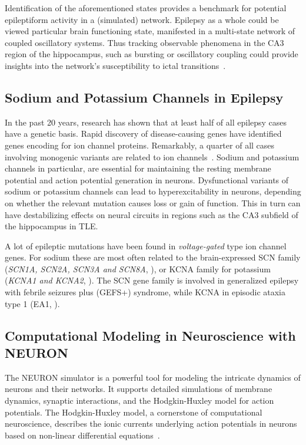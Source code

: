 \noindent
Identification of the aforementioned states provides a benchmark for potential epileptiform activity in a (simulated) network.
Epilepsy as a whole could be viewed particular brain functioning state, manifested in a multi-state network of coupled oscillatory systems.
Thus tracking observable phenomena in the CA3 region of the hippocampus, such as bursting or oscillatory coupling could provide insights 
into the network's susceptibility to ictal transitions~\parencite{kalitzinEpilepsyManifestationMultistate2019a}.

\subsection{Sodium and Potassium Channels in Epilepsy}
In the past 20 years, research has shown that at least half of all epilepsy cases have a genetic basis.
Rapid discovery of disease-causing genes have identified genes encoding for ion channel proteins.
Remarkably, a quarter of all cases involving monogenic variants are related to ion channels~\parencite{strianoGeneticTestingPrecision2020,oyrerIonChannelsGenetic2018}.
Sodium and potassium channels in particular, are essential for maintaining the resting
membrane potential and action potential generation in neurons.
Dysfunctional variants of sodium or potassium channels can lead to hyperexcitability in neurons, depending on whether the relevant mutation causes loss or gain of function.
This in turn can have destabilizing effects on neural circuits in regions such as the CA3 subfield of the hippocampus in TLE\@.

A lot of epileptic mutations have been found in \textit{voltage-gated} type ion channel genes.
For sodium these are most often related to the brain-expressed SCN family (\textit{SCN1A, SCN2A, SCN3A and SCN8A}, \textcite{brunklausSodiumChannelEpilepsies2020}), 
or KCNA family for potassium  (\textit{KCNA1 and KCNA2}, \textcite{gaoPotassiumChannelsEpilepsy2022}).
The SCN gene family is involved in  generalized epilepsy with febrile seizures plus (GEFS+) syndrome, while KCNA in episodic ataxia type 1 (EA1, \textcite{gravesIonChannelsEpilepsy2006}).

\subsection{Computational Modeling in Neuroscience with NEURON}
The NEURON simulator is a powerful tool for modeling the intricate dynamics 
of neurons and their networks. It supports detailed simulations of membrane 
dynamics, synaptic interactions, and the Hodgkin-Huxley model for action 
potentials. The Hodgkin-Huxley model, a cornerstone of computational neuroscience,
describes the ionic currents underlying action potentials in neurons based
on non-linear differential equations~\parencite{hodgkinMeasurementCurrentvoltageRelations1952}.

